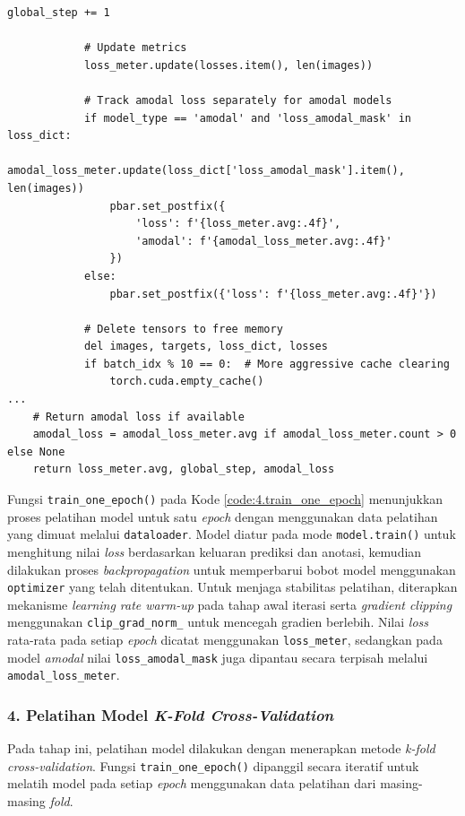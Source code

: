 \begin{lstlisting}[caption={Proses Pelatihan Model per Epoch}, label={code:4.train_one_epoch}]
            global_step += 1
            
            # Update metrics
            loss_meter.update(losses.item(), len(images))
            
            # Track amodal loss separately for amodal models
            if model_type == 'amodal' and 'loss_amodal_mask' in loss_dict:
                amodal_loss_meter.update(loss_dict['loss_amodal_mask'].item(), len(images))
                pbar.set_postfix({
                    'loss': f'{loss_meter.avg:.4f}',
                    'amodal': f'{amodal_loss_meter.avg:.4f}'
                })
            else:
                pbar.set_postfix({'loss': f'{loss_meter.avg:.4f}'})
            
            # Delete tensors to free memory
            del images, targets, loss_dict, losses
            if batch_idx % 10 == 0:  # More aggressive cache clearing
                torch.cuda.empty_cache()
...
    # Return amodal loss if available
    amodal_loss = amodal_loss_meter.avg if amodal_loss_meter.count > 0 else None
    return loss_meter.avg, global_step, amodal_loss
\end{lstlisting}

Fungsi \texttt{train\_one\_epoch()} pada Kode \ref{code:4.train_one_epoch} menunjukkan proses pelatihan model untuk satu \textit{epoch} dengan menggunakan data pelatihan yang dimuat melalui \texttt{dataloader}. Model diatur pada mode \texttt{model.train()} untuk menghitung nilai \textit{loss} berdasarkan keluaran prediksi dan anotasi, kemudian dilakukan proses \textit{backpropagation} untuk memperbarui bobot model menggunakan \texttt{optimizer} yang telah ditentukan. Untuk menjaga stabilitas pelatihan, diterapkan mekanisme \textit{learning rate warm-up} pada tahap awal iterasi serta \textit{gradient clipping} menggunakan \texttt{clip\_grad\_norm\_} untuk mencegah gradien berlebih. Nilai \textit{loss} rata-rata pada setiap \textit{epoch} dicatat menggunakan \texttt{loss\_meter}, sedangkan pada model \textit{amodal} nilai \texttt{loss\_amodal\_mask} juga dipantau secara terpisah melalui \texttt{amodal\_loss\_meter}. \par

\subsubsection*{\textnormal{4. Pelatihan Model \textit{K-Fold Cross-Validation}}}
Pada tahap ini, pelatihan model dilakukan dengan menerapkan metode \textit{k-fold cross-validation}. Fungsi \texttt{train\_one\_epoch()} dipanggil secara iteratif untuk melatih model pada setiap \textit{epoch} menggunakan data pelatihan dari masing-masing \textit{fold}.

